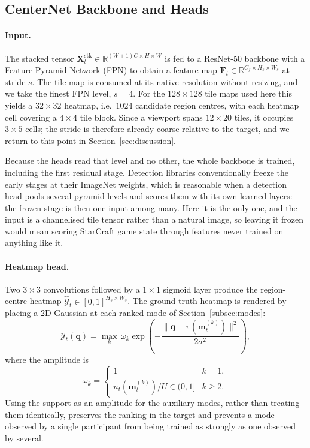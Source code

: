 \documentclass[preprint,12pt]{elsarticle}
\begin{document}
\subsection{CenterNet Backbone and Heads}

\paragraph{Input.} The stacked tensor
$\mathbf{X}^{\text{stk}}_t \in \mathbb{R}^{(W+1)C \times H \times W}$ is
fed to a ResNet-50 \cite{he2016deep} backbone with a Feature Pyramid Network
(FPN) \cite{lin2017feature} to obtain a feature map
$\mathbf{F}_t \in \mathbb{R}^{C_f \times H_s \times W_s}$ at stride $s$.
The tile map is consumed at its native resolution without resizing, and we
take the finest FPN level, $s=4$. For the $128 \times 128$ tile maps used here
this yields a $32 \times 32$ heatmap, i.e.\ $1024$ candidate region centres,
with each heatmap cell covering a $4 \times 4$ tile block. Since a viewport
spans $12 \times 20$ tiles, it occupies $3 \times 5$ cells; the stride is
therefore already coarse relative to the target, and we return to this point in
Section~\ref{sec:discussion}.

Because the heads read that level and no other, the whole backbone is trained,
including the first residual stage. Detection libraries conventionally freeze
the early stages at their ImageNet weights, which is reasonable when a
detection head pools several pyramid levels and scores them with its own
learned layers: the frozen stage is then one input among many. Here it is the
only one, and the input is a channelised tile tensor rather than a natural
image, so leaving it frozen would mean scoring StarCraft game state through
features never trained on anything like it.

\paragraph{Heatmap head.} Two $3{\times}3$ convolutions followed by a
$1{\times}1$ sigmoid layer produce the region-centre heatmap
$\hat{\mathcal{Y}}_t \in [0,1]^{H_s \times W_s}$. The ground-truth heatmap is
rendered by placing a 2D Gaussian at each ranked mode of
Section~\ref{subsec:modes}:
\begin{equation}
  \mathcal{Y}_t(\mathbf{q}) = \max_k\, \omega_k
    \exp\!\left(-\frac{\|\mathbf{q} - \pi(\mathbf{m}^{(k)}_t)\|^2}
                      {2\sigma^2}\right),
  \label{eq:gt_heatmap}
\end{equation}
where the amplitude is
\begin{equation}
  \omega_k = \begin{cases}
    1 & k = 1, \\
    n_t(\mathbf{m}^{(k)}_t)/U \in (0,1] & k \ge 2.
  \end{cases}
  \label{eq:amplitude}
\end{equation}
Using the support as an amplitude for the auxiliary modes, rather than treating
them identically, preserves the ranking in the target and prevents a mode
observed by a single participant from being trained as strongly as one observed
by several.
\end{document}
